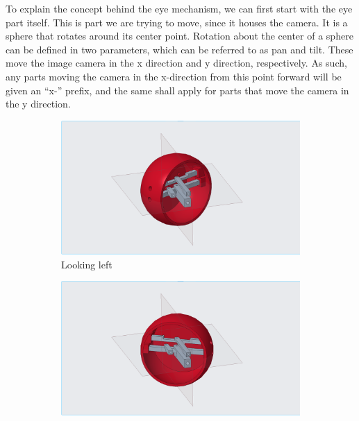 To explain the concept behind the eye mechanism, we can first start with the eye part itself. This is part we are trying to move, since it houses the camera. It is a sphere that rotates around its center point. Rotation about the center of a sphere can be defined in two parameters, which can be referred to as pan and tilt. These move the image camera in the x direction and y direction, respectively. As such, any parts moving the camera in the x-direction from this point forward will be given an ``x-'' prefix, and the same shall apply for parts that move the camera in the y direction.

\begin{figure}[h]
    \centering
    \begin{subfigure}[b]{0.475\textwidth}   
            \centering 
            \includegraphics[width=\textwidth]{Thesis/ch2/left.png}
            \caption[]%
            {{\small Looking left}}    
            \label{fig:left}
    \end{subfigure}
    \hfill
    \begin{subfigure}[b]{0.475\textwidth}   
        \centering 
        \includegraphics[width=\textwidth]{Thesis/ch2/right.png}

\end{subfigure}
\end{figure}
